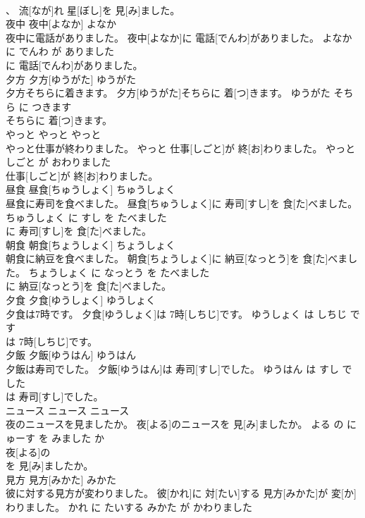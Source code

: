\documentclass[8pt]{extreport}
\begin{document}
\begin{CJK}{UTF8}{min}
\\	、 流[なが]れ 星[ぼし]を 見[み]ました。			
\\	夜中	夜中[よなか]	よなか	
\\	夜中に電話がありました。	夜中[よなか]に 電話[でんわ]がありました。	よなか に でんわ が ありました	
\\	に 電話[でんわ]がありました。			
\\	夕方	夕方[ゆうがた]	ゆうがた	
\\	夕方そちらに着きます。	夕方[ゆうがた]そちらに 着[つ]きます。	ゆうがた そちら に つきます	
\\	そちらに 着[つ]きます。			
\\	やっと	やっと	やっと	
\\	やっと仕事が終わりました。	やっと 仕事[しごと]が 終[お]わりました。	やっと しごと が おわりました	
\\	仕事[しごと]が 終[お]わりました。			
\\	昼食	昼食[ちゅうしょく]	ちゅうしょく	
\\	昼食に寿司を食べました。	昼食[ちゅうしょく]に 寿司[すし]を 食[た]べました。	ちゅうしょく に すし を たべました	
\\	に 寿司[すし]を 食[た]べました。			
\\	朝食	朝食[ちょうしょく]	ちょうしょく	
\\	朝食に納豆を食べました。	朝食[ちょうしょく]に 納豆[なっとう]を 食[た]べました。	ちょうしょく に なっとう を たべました	
\\	に 納豆[なっとう]を 食[た]べました。			
\\	夕食	夕食[ゆうしょく]	ゆうしょく	
\\	夕食は7時です。	夕食[ゆうしょく]は 7時[しちじ]です。	ゆうしょく は しちじ です	
\\	は 7時[しちじ]です。			
\\	夕飯	夕飯[ゆうはん]	ゆうはん	
\\	夕飯は寿司でした。	夕飯[ゆうはん]は 寿司[すし]でした。	ゆうはん は すし でした	
\\	は 寿司[すし]でした。			
\\	ニュース	ニュース	ニュース	
\\	夜のニュースを見ましたか。	夜[よる]のニュースを 見[み]ましたか。	よる の にゅーす を みました か	
\\	夜[よる]の
\\	を 見[み]ましたか。			
\\	見方	見方[みかた]	みかた	
\\	彼に対する見方が変わりました。	彼[かれ]に 対[たい]する 見方[みかた]が 変[か]わりました。	かれ に たいする みかた が かわりました	

\end{CJK}
\end{document}
